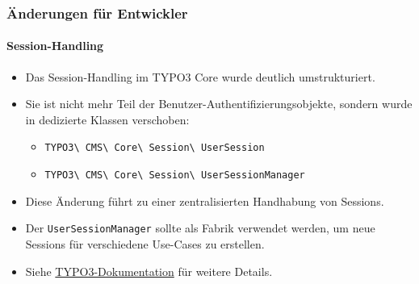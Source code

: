 %

\begin{frame}[fragile]
	\frametitle{Änderungen für Entwickler}
	\framesubtitle{Session-Handling}

	\lstset{basicstyle=\tiny\ttfamily}

	\begin{itemize}
		\item Das Session-Handling im TYPO3 Core wurde deutlich umstrukturiert.
		\item Sie ist nicht mehr Teil der Benutzer-Authentifizierungsobjekte,
			sondern wurde in dedizierte Klassen verschoben:

			\begin{itemize}\small
				\item \texttt{TYPO3\textbackslash
					CMS\textbackslash
					Core\textbackslash
					Session\textbackslash
					UserSession}
				\item \texttt{TYPO3\textbackslash
					CMS\textbackslash
					Core\textbackslash
					Session\textbackslash
					UserSessionManager}
			\end{itemize}

		\item Diese Änderung führt zu einer zentralisierten Handhabung von Sessions.
		\item Der \texttt{UserSessionManager} sollte als Fabrik verwendet werden,
			um neue Sessions für verschiedene Use-Cases zu erstellen.
		\item Siehe
			\href{https://docs.typo3.org/m/typo3/reference-coreapi/master/en-us/ApiOverview/SessionStorageFramework/Index.html}{TYPO3-Dokumentation}
			für weitere Details.
	\end{itemize}

\end{frame}

